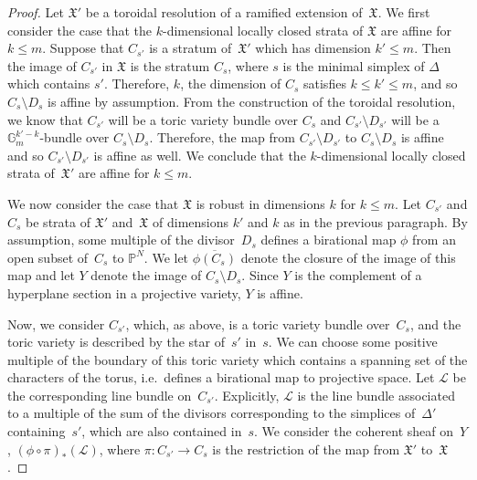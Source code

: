\documentclass[11pt]{amsart}
\theoremstyle{definition}
\newcommand{\Gm}{\mathbb G_m}
\newcommand{\PP}{\mathbb P}
\newcommand{\X}{\mathfrak X}
\begin{document}
\begin{proof}
Let $\X'$ be a toroidal resolution of a ramified extension of~$\X$.
We first consider the case that the $k$-dimensional locally closed strata of
$\X$ are affine for
$k \leq m$. Suppose that $C_{s'}$ is a stratum of~$\X'$ which has
dimension $k' \leq m$. Then the image of $C_{s'}$ in $\X$ is the stratum $C_s$,
where $s$ is the minimal simplex of $\Delta$ which contains $s'$. Therefore,
$k$, the dimension of $C_s$ satisfies $k \leq k' \leq m$, and so $C_s \setminus
D_s$ is affine by assumption. From the construction of the toroidal resolution,
we know that $C_{s'}$ will be a toric variety bundle over $C_s$ and $C_{s'}
\setminus D_{s'}$ will be a $\Gm^{k' - k}$-bundle over $C_s \setminus D_s$.
Therefore, the map from $C_{s'} \setminus D_{s'}$ to $C_s \setminus D_s$ is
affine and so $C_{s'} \setminus D_{s'}$ is affine as well. We conclude that
the $k$-dimensional locally closed strata of~$\X'$ are affine for $k \leq m$.

We now consider the case that $\X$ is robust in dimensions $k$ for $k \leq m$.
Let $C_{s'}$ and $C_s$ be strata of $\X'$ and~$\X$ of dimensions $k'$ and $k$ as
in the previous paragraph. By assumption, some multiple of the divisor~$D_s$
defines a birational map $\phi$ from an open subset of~$C_s$ to $\PP^N$. We let
$\overline{\phi(C_s)}$ denote the closure of the image of this map and let $Y$
denote the image of $C_s \setminus D_s$. Since $Y$ is the complement of a
hyperplane section in a projective variety, $Y$ is affine.

Now, we consider $C_{s'}$, which, as above, is a toric variety bundle
over~$C_s$, and the toric variety is described by the star of~$s'$ in~$s$. We
can choose some positive multiple of the boundary of this toric variety which
contains a spanning set of the characters of the torus, i.e.\ defines a
birational map to projective space. Let $\mathcal L$ be the corresponding line
bundle on~$C_{s'}$. Explicitly, $\mathcal L$ is the line bundle associated to a
multiple of the sum of the divisors corresponding to the simplices of~$\Delta'$
containing~$s'$, which are also contained in~$s$. We consider the coherent sheaf
on~$Y$, $(\phi\circ\pi)_* (\mathcal L)$, where $\pi \colon C_{s'} \rightarrow
C_s$ is the restriction of the map from $\X'$ to~$\X$.


\end{proof}
\end{document}
